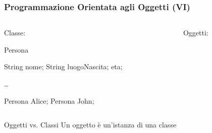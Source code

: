 \begin{frame}[fragile]\frametitle{Programmazione Orientata agli Oggetti (VI)}


  \begin{columns}[T]
    \begin{column}[T]{7cm}
    Classe:
    \begin{JavaCodePlain}[commandchars=\\!|]
    
    \Jpublic \Jclass Persona {

      \Jprivate String nome;      
      \Jprivate String luogoNascita;
      \Jprivate \Jint eta;

    }

    \dots
    
    Persona Alice;
    Persona John;

    \end{JavaCodePlain}
    \end{column}

    \begin{column}[T]{5cm}
    Oggetti:
    \begin{center}
    \end{center}
    \end{column}
  \end{columns}

  \begin{alertblock}{Oggetti vs. Classi}
    Un oggetto è un'istanza di una classe
  \end{alertblock}
  
\end{frame}

